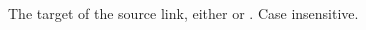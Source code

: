 \documentclass[letterpaper,10pt,english]{sphinxmanual}
\begin{document}
\begin{fulllineitems}
\label{\detokenize{confval:confval-source_link_target}}~
\vspace{-45px}

\begin{DUlineblock}{0em}
\item[]  
\item[]  
\item[]  
\end{DUlineblock}

\vspace{-25px}

The target of the source link, either  or .
Case insensitive.

\end{fulllineitems}



\vspace{5px}

\begin{fulllineitems}
\label{\detokenize{confval:confval-github_username}}~
\vspace{-45px}

\begin{DUlineblock}{0em}
\item[]  
\item[]  
\end{DUlineblock}

\end{fulllineitems}



\vspace{5px}
\end{document}
